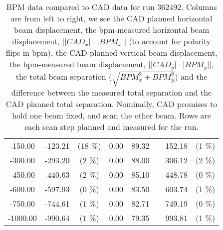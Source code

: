 \begin{table}
\begin{tabular}{c c c c c c c c}
-150.00 & -123.21 &  (18 \%) & 0.00 & 89.32 &  & 152.18 &  (1 \%)\\
-300.00 & -293.20 &  (2 \%) & 0.00 & 88.00 &  & 306.12 &  (2 \%)\\
-450.00 & -440.63 &  (2 \%) & 0.00 & 85.10 &  & 448.78 &  (0 \%)\\
-600.00 & -597.93 &  (0 \%) & 0.00 & 83.50 &  & 603.74 &  (1 \%)\\
-750.00 & -744.61 &  (1 \%) & 0.00 & 82.71 &  & 749.19 &  (0 \%)\\
-1000.00 & -990.64 &  (1 \%) & 0.00 & 79.35 &  & 993.81 &  (1 \%)\\
\bottomrule
\end{tabular}
\caption{ BPM data compared to CAD data for run 362492. Columns are from left to right, we see the CAD planned horizontal beam displacement, the bpm-measured horizontal beam displacement, $||CAD_{x}| - |BPM_{x}||$ (to account for polarity flips in bpm), the CAD planned vertical beam displacement, the bpm-measured beam displacement, $||CAD_{y}| - |BPM_{y}||$, the total beam separation ($\sqrt{BPM_{x}^2+BPM_{y}^2}$) and the difference between the measured total separation and the CAD planned total separation. Nominally, CAD promises to hold one beam fixed, and scan the other beam. Rows are each scan step planned and measured for the run. }
\label{0xff85589c}
\end{table}
